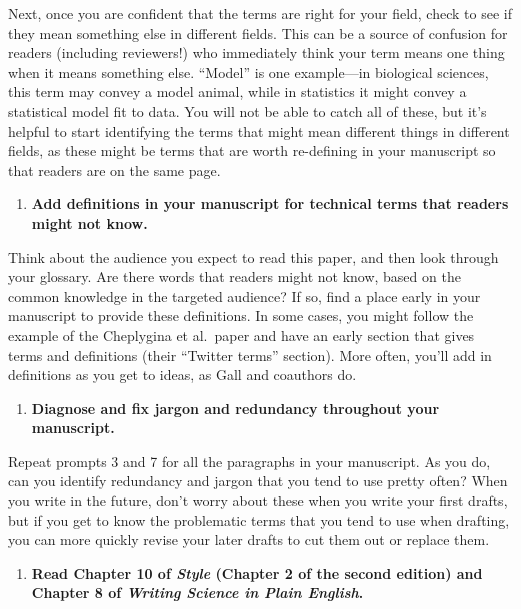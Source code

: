 \documentclass[]{tufte-book}
\providecommand{\tightlist}{%
  \setlength{\itemsep}{0pt}\setlength{\parskip}{0pt}}
\begin{document}
Next, once you are confident that the terms are right for your field, check to
see if they mean something else in different fields. This can be a source of
confusion for readers (including reviewers!) who immediately think your term
means one thing when it means something else. ``Model'' is one example---in
biological sciences, this term may convey a model animal, while in statistics
it might convey a statistical model fit to data. You will not be able to catch
all of these, but it's helpful to start identifying the terms that might mean
different things in different fields, as these might be terms that are worth
re-defining in your manuscript so that readers are on the same page.

\begin{enumerate}
\def\labelenumi{\arabic{enumi}.}
\setcounter{enumi}{8}
\tightlist
\item
  \textbf{Add definitions in your manuscript for technical terms that readers might not know.}
\end{enumerate}

Think about the audience you expect to read this paper, and then look through
your glossary. Are there words that readers might not know, based on the common
knowledge in the targeted audience? If so, find a place early in your manuscript
to provide these definitions. In some cases, you might follow the example of the
Cheplygina et al.~paper and have an early section that gives terms and definitions
(their ``Twitter terms'' section). More often, you'll add in definitions as you get
to ideas, as Gall and coauthors do.

\begin{enumerate}
\def\labelenumi{\arabic{enumi}.}
\setcounter{enumi}{9}
\tightlist
\item
  \textbf{Diagnose and fix jargon and redundancy throughout your manuscript.}
\end{enumerate}

Repeat prompts 3 and 7 for all the paragraphs in your manuscript. As you do, can
you identify redundancy and jargon that you tend to use pretty often? When you
write in the future, don't worry about these when you write your first drafts,
but if you get to know the problematic terms that you tend to use when drafting,
you can more quickly revise your later drafts to cut them out or replace them.

\begin{enumerate}
\def\labelenumi{\arabic{enumi}.}
\setcounter{enumi}{10}
\tightlist
\item
  \textbf{Read Chapter 10 of \emph{Style} (Chapter 2 of the second edition) and Chapter 8 of \emph{Writing Science in Plain English}.}
\end{enumerate}
\end{document}
